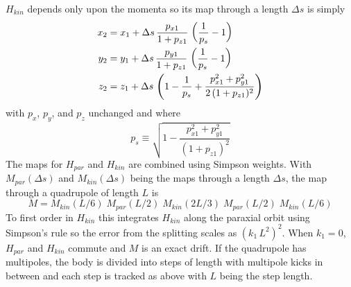 $H_{kin}$ depends only upon the momenta so its map through a length $\Delta s$ is simply
\begin{align}
  x_2 &= x_1 + \Delta s \, \frac{p_{x1}}{1 + p_{z1}} \, \left( \frac{1}{p_s} - 1 \right) \nonumber \\
  y_2 &= y_1 + \Delta s \, \frac{p_{y1}}{1 + p_{z1}} \, \left( \frac{1}{p_s} - 1 \right) \\
  z_2 &= z_1 + \Delta s \, \left( 1 - \frac{1}{p_s} + \frac{p_{x1}^2 + p_{y1}^2}{2 \, (1 + p_{z1})^2} \right) \nonumber
\end{align}
with $p_x$, $p_y$, and $p_z$ unchanged and where
\begin{equation}
  p_s \equiv \sqrt{1 - \frac{p_{x1}^2 + p_{y1}^2}{(1 + p_{z1})^2}}
\end{equation}
The maps for $H_{par}$ and $H_{kin}$ are combined using Simpson weights. With $M_{par}(\Delta s)$ and
$M_{kin}(\Delta s)$ being the maps through a length $\Delta s$, the map through a quadrupole of length
$L$ is
\begin{equation}
  M = M_{kin}(L/6) \; M_{par}(L/2) \; M_{kin}(2L/3) \; M_{par}(L/2) \; M_{kin}(L/6)
\end{equation}
To first order in $H_{kin}$ this integrates $H_{kin}$ along the paraxial orbit using Simpson's rule
so the error from the splitting scales as $(k_1 \, L^2)^2$. When $k_1 = 0$, $H_{par}$ and $H_{kin}$
commute and $M$ is an exact drift. If the quadrupole has multipoles, the body is divided into steps
of length  with multipole kicks in between and each step is tracked as above with $L$
being the step length.

